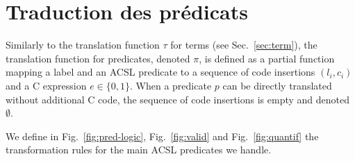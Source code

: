 \section{Traduction des prédicats \acsl}
\label{sec:pred}

Similarly to the translation function $\tau$ for terms (see
Sec.~\ref{sec:term}), the translation function for predicates, denoted $\pi$,
is defined as a partial function mapping a label and an \textsc{ACSL} predicate
to a sequence of code insertions
$(l_i, c_i)$ and a C expression $e \in \{0, 1\}$.
When a predicate $p$ can be directly translated without additional C code, 
the sequence of code insertions is empty and denoted $\emptyset$.


We define in Fig.~\ref{fig:pred-logic},
Fig.~\ref{fig:valid} and Fig.~\ref{fig:quantif} the transformation rules for the
main \textsc{ACSL} predicates we handle.



